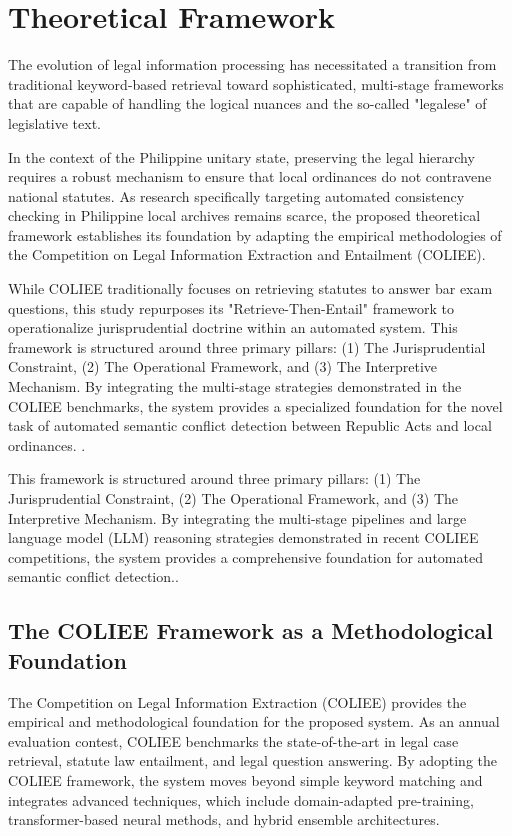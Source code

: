 \section{Theoretical Framework}
The evolution of legal information processing has necessitated a transition from traditional keyword-based retrieval toward sophisticated, multi-stage frameworks that are capable of handling the logical nuances and the so-called "legalese" of legislative text.

In the context of the Philippine unitary state, preserving the legal hierarchy requires a robust mechanism to ensure that local ordinances do not contravene national statutes. As research specifically targeting automated consistency checking in Philippine local archives remains scarce, the proposed theoretical framework establishes its foundation by adapting the empirical methodologies of the Competition on Legal Information Extraction and Entailment (COLIEE). 

While COLIEE traditionally focuses on retrieving statutes to answer bar exam questions, this study repurposes its "Retrieve-Then-Entail" framework to operationalize jurisprudential doctrine within an automated system. This framework is structured around three primary pillars: (1) The Jurisprudential Constraint, (2) The Operational Framework, and (3) The Interpretive Mechanism. By integrating the multi-stage strategies demonstrated in the COLIEE benchmarks, the system provides a specialized foundation for the novel task of automated semantic conflict detection between Republic Acts and local ordinances. \cite{nguyen2025nowjcoliee2025multistageframework}.

This framework is structured around three primary pillars: (1) The Jurisprudential Constraint, (2) The Operational Framework, and (3) The Interpretive Mechanism. By integrating the multi-stage pipelines and large language model (LLM) reasoning strategies demonstrated in recent COLIEE competitions, the system provides a comprehensive foundation for automated semantic conflict detection.\cite{nguyen2025nowjcoliee2025multistageframework}.

\subsection{The COLIEE Framework as a Methodological Foundation}
The Competition on Legal Information Extraction (COLIEE) provides the empirical and methodological foundation for the proposed system. As an annual evaluation contest, COLIEE benchmarks the state-of-the-art in legal case retrieval, statute law entailment, and legal question answering. By adopting the COLIEE framework, the system moves beyond simple keyword matching and integrates advanced techniques, which include domain-adapted pre-training, transformer-based neural methods, and hybrid ensemble architectures.

